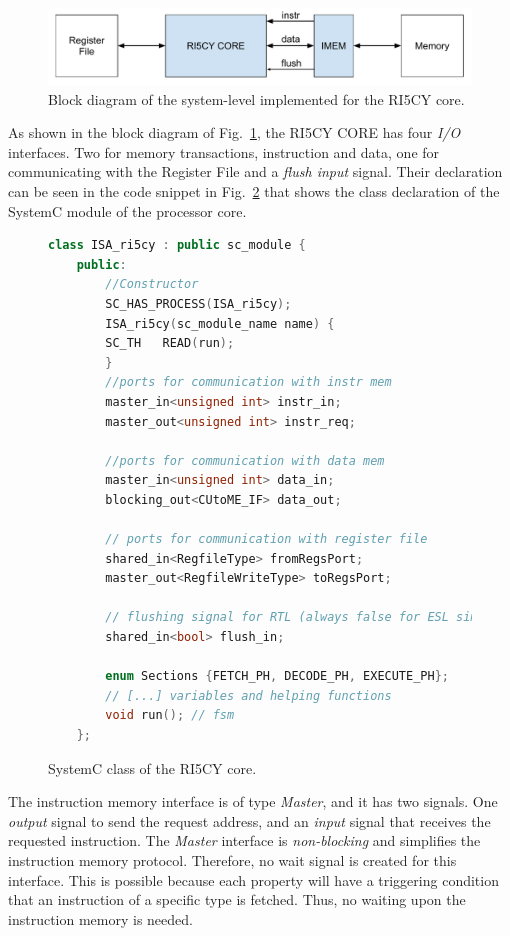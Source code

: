 \begin{figure}[htb!]
	\centering
	\includegraphics[width=\textwidth]{images/sim-block-diagram.pdf}
	\caption{Block diagram of the system-level implemented for the RI5CY core.}
	\label{fig:sim-ri5cy-diagram}
\end{figure}

As shown in the block diagram of Fig.~\ref{fig:sim-ri5cy-diagram}, the RI5CY CORE has four \textit{I/O} interfaces. Two for memory transactions, instruction and data, one for communicating with the Register File and a \textit{flush input} signal. Their declaration can be seen in the code snippet in Fig.~\ref{fig:ri5cy-sc-module} that shows the class declaration of the SystemC module of the processor core.

\begin{figure}[htb!]
    \begin{lstlisting}[language=c++]
    class ISA_ri5cy : public sc_module {
    public:
        //Constructor
        SC_HAS_PROCESS(ISA_ri5cy);
        ISA_ri5cy(sc_module_name name) {
        SC_TH   READ(run);
        }
        //ports for communication with instr mem
        master_in<unsigned int> instr_in;
        master_out<unsigned int> instr_req;
        
        //ports for communication with data mem
        master_in<unsigned int> data_in;
        blocking_out<CUtoME_IF> data_out;
        
        // ports for communication with register file
        shared_in<RegfileType> fromRegsPort;
        master_out<RegfileWriteType> toRegsPort;
        
        // flushing signal for RTL (always false for ESL simulation)
        shared_in<bool> flush_in;
        
        enum Sections {FETCH_PH, DECODE_PH, EXECUTE_PH};
        // [...] variables and helping functions
        void run(); // fsm
    };\end{lstlisting}
    \caption{SystemC class of the RI5CY core.}
    \label{fig:ri5cy-sc-module}
\end{figure}

The instruction memory interface is of type \textit{Master}, and it has two signals. One \textit{output} signal to send the request address, and an \textit{input} signal that receives the requested instruction. The \textit{Master} interface is \textit{non-blocking} and simplifies the instruction memory protocol. Therefore, no wait signal is created for this interface. This is possible because each property will have a triggering condition that an instruction of a specific type is fetched. Thus, no waiting upon the instruction memory is needed.

